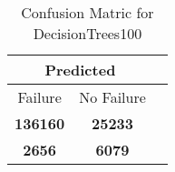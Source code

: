 \begin{table}[] 
\caption{Confusion Matric for DecisionTrees100} 
\label{Table: Prediction Accuracy-NoneDecisionTrees100DecisionTrees100EKF-ignoreReflection-Reflection} 
\centering 
\begin{tabular} 
 {@{}ccc@{}} 
\toprule 
\multicolumn{2}{c}{\textbf{Predicted}}
 \\ \midrule 
\multicolumn{1}{|c|}{Failure} & 
\multicolumn{1}{c|}{No Failure}
 \\ \midrule 
\multicolumn{1}{|c|}{\color{green}\textbf{136160}} & 
\multicolumn{1}{c|}{\color{green}\textbf{25233}}
 \\ \midrule 
\multicolumn{1}{|c|}{\color{red}\textbf{2656}} & 
\multicolumn{1}{c|}{\color{red}\textbf{6079}}
 \\ \bottomrule 
\end{tabular} 
\end{table} 
